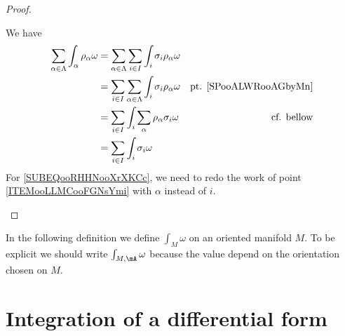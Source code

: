 \begin{proof}
\begin{subproof}
		\begin{subproof}

					\label{SPooALWRooAGbyMn}

			\spitem[Conclusion]
			We have
			\begin{subequations}
				\begin{align}
					\sum_{\alpha\in \Lambda}\int_{\alpha}\rho_{\alpha}\omega & =\sum_{\alpha\in\Lambda}\sum_{i\in I}\int_i\sigma_i\rho_{\alpha}\omega                                                \\
					                                                         & =\sum_{i\in I}\sum_{\alpha\in\Lambda}\int_i\sigma_i\rho_{\alpha}\omega & \text{pt. \ref{SPooALWRooAGbyMn}}            \\
					                                                         & =\sum_{i\in I}\int_{i}\sum_{\alpha}\rho_{\alpha}\sigma_i\omega         & \text{cf. bellow}		\label{SUBEQooRHHNooXrXKCc} \\
					                                                         & = \sum_{i\in I}\int_i\sigma_i\omega
				\end{align}
			\end{subequations}
			For \eqref{SUBEQooRHHNooXrXKCc}, we need to redo the work of point \ref{ITEMooLLMCooFGNsYmi} with \( \alpha\) instead of \( i\).
		\end{subproof}
	\end{subproof}
\end{proof}

In the following definition we define \( \int_M\omega\) on an oriented manifold \( M\). To be explicit we should write \( \int_{M,\mA}\omega\) because the value depend on the orientation chosen on \( M\).

\section{Integration of a differential form}

